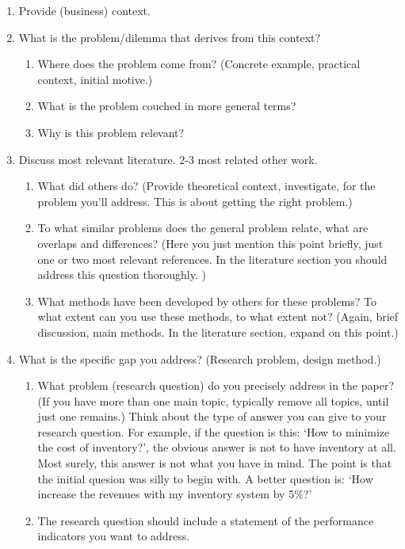 \documentclass{article}
\begin{document}
\begin{enumerate}
\item Provide (business) context. 
\item What is the problem/dilemma that derives from this context?
  \begin{enumerate}
\item Where does the problem come from? (Concrete example, practical context, initial motive.)
\item What is the problem couched in more general terms?
\item Why is this problem relevant?
  \end{enumerate}
\item Discuss most relevant literature. 2-3 most related other work.
  \begin{enumerate}
  \item  What did others do? (Provide theoretical context, investigate,
  for the problem you'll address.  This is about getting the right
  problem.)
  \item To what similar problems does the general problem relate, what
    are overlaps and differences?  (Here you just mention this point
    briefly, just one or two most relevant references.  In the
    literature section you should address this question thoroughly. )
  \item What methods have been developed by others for these problems?
    To what extent can you use these methods, to what extent not?
    (Again, brief discussion, main methods.  In the literature
    section, expand on this point.)
  \end{enumerate}
\item What is the specific gap you address? (Research problem, design method.)
  \begin{enumerate}
  \item What problem (research question) do you precisely address in
    the paper? (If you have more than one main topic, typically remove
    all topics, until just one remains.) Think about the type of
    answer you can give to your research question. For example, if the
    question is this: `How to minimize the cost of inventory?', the
    obvious answer is not to have inventory at all. Most surely, this
    answer is not what you have in mind. The point is that the initial
    quesion was silly to begin with. A better question is: `How
    increase the revenues with my inventory system by 5\%?'
  \item The research question should include a statement of the performance indicators you want to address.

\end{enumerate}
\end{enumerate}
\end{document}
